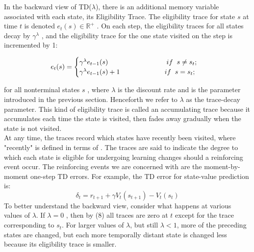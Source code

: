 \documentclass[11pt]{article}
\theoremstyle{plain}
\theoremstyle{definition}
\begin{document}
In the backward view of TD($\lambda $), there is an additional memory variable associated with each state, its Eligibility Trace. The eligibility trace for state $s$ at time $t$  is denoted $e_t(s) \in \mathbb{R}^+$ . On each step, the eligibility traces for all states decay by $\gamma^\lambda$ , and the eligibility trace for the one state visited on the step is incremented by 1:

\begin{equation}
e_t(s) = 
\begin{cases}
\gamma^\lambda e_{t-1}(s) \hspace{3cm} if \hspace{0.2cm} s \neq s_t;\\
\gamma^\lambda e_{t-1}(s)+1 \hspace{2.3cm} if  \hspace{0.2cm}  s = s_t;
\end{cases}
\end{equation} 

for all nonterminal states $s$ , where $\lambda$  is the discount rate and  is the parameter introduced in the previous section. Henceforth we refer to $\lambda $ as the trace-decay parameter. This kind of eligibility trace is called an accumulating trace because it accumulates each time the state is visited, then fades away gradually when the state is not visited.\\
At any time, the traces record which states have recently been visited, where "recently" is defined in terms of . The traces are said to indicate the degree to which each state is eligible for undergoing learning changes should a reinforcing event occur. The reinforcing events we are concerned with are the moment-by-moment one-step TD errors. For example, the TD error for state-value prediction is:
\begin{equation}
\delta_t= r_{t+1} + \gamma V_t(s_{t+1}) - V_t(s_t)
\end{equation} 
To better understand the backward view, consider what happens at various values of $\lambda $. If $\lambda=0 $ , then by (8) all traces are zero at $t$ except for the trace corresponding to $s_t$. For larger values of $\lambda $, but still $\lambda <1$, more of the preceding states are changed, but each more temporally distant state is changed less because its eligibility trace is smaller.
\end{document}
